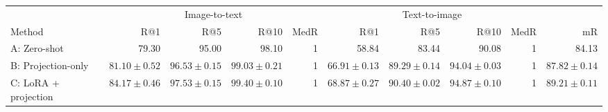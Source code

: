 \begin{tabular}{lrrrrrrrrr}
\toprule
& \multicolumn{4}{c}{Image-to-text} & \multicolumn{4}{c}{Text-to-image} & \\
\cmidrule(lr){2-5}\cmidrule(lr){6-9}
Method & R@1 & R@5 & R@10 & MedR & R@1 & R@5 & R@10 & MedR & mR\\
\midrule
A: Zero-shot & 79.30 & 95.00 & 98.10 & 1 & 58.84 & 83.44 & 90.08 & 1 & 84.13 \\
B: Projection-only & $81.10 \pm 0.52$ & $96.53 \pm 0.15$ & $99.03 \pm 0.21$ & 1 & $66.91 \pm 0.13$ & $89.29 \pm 0.14$ & $94.04 \pm 0.03$ & 1 & $87.82 \pm 0.14$ \\
C: LoRA + projection & $84.17 \pm 0.46$ & $97.53 \pm 0.15$ & $99.40 \pm 0.10$ & 1 & $68.87 \pm 0.27$ & $90.40 \pm 0.02$ & $94.87 \pm 0.10$ & 1 & $89.21 \pm 0.11$ \\
\bottomrule
\end{tabular}
